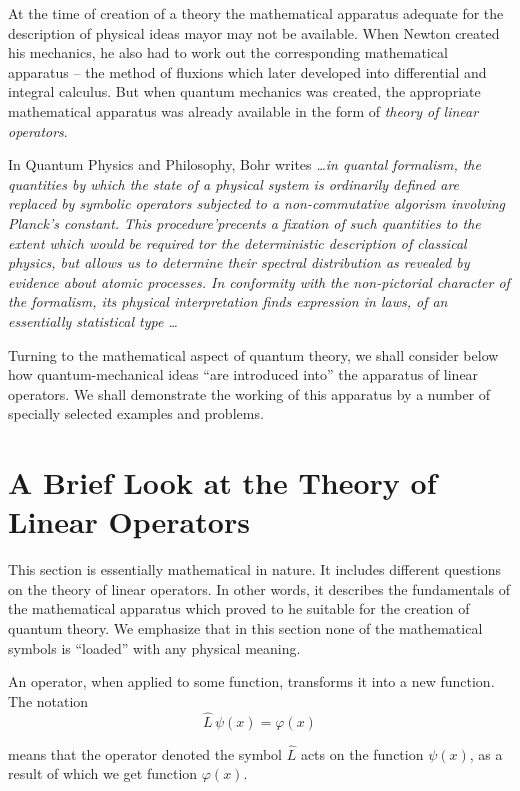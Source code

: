 \documentclass[a4paper,sfsidenotes,colorlinks=true]{tufte-book}
\numberwithin{equation}{section}
\numberwithin{figure}{section}
\begin{document}
At the time of creation of a theory the mathematical apparatus
adequate for the description of physical ideas mayor may not be
available. When Newton created his mechanics, he also had to work out
the corresponding mathematical apparatus -- the method of fluxions
which later developed into differential and integral calculus. But
when quantum mechanics was created, the appropriate mathematical
apparatus was already available in the form of \emph{theory of linear
  operators}.

In Quantum Physics and Philosophy\cite{bohr-1963}, Bohr writes \emph{
  \ldots in quantal formalism, the quantities by which the state of
  a physical system is ordinarily defined are replaced by symbolic
  operators subjected to a non-commutative algorism involving Planck's
  constant. This procedure'precents a fixation of such quantities to
  the extent which would be required tor the deterministic description
  of classical physics, but allows us to determine their spectral
  distribution as revealed by evidence about atomic processes. In
  conformity with the non-pictorial character of the formalism, its
  physical interpretation finds expression in laws, of an
  essentially statistical type \ldots}  

Turning to the mathematical aspect of quantum theory, we shall
consider below how quantum-mechanical ideas ``are introduced into'' the
apparatus of linear operators. We shall demonstrate the working of
this apparatus by a number of specially selected examples and
problems.  


\section{A Brief Look at the Theory of Linear Operators}
\label{sec-17}
This section is essentially mathematical in nature. It includes
different questions on the theory of linear operators. In other
words, it describes the fundamentals of the mathematical apparatus
which proved to he suitable for the creation of quantum theory. We
emphasize that in this section none of the mathematical symbols is
``loaded'' with any physical meaning.

An operator, when
applied to some function, transforms it into a new function. The
notation 
\begin{equation}%
\hat{L} \, \psi (x) = \varphi (x)
\label{eq-17.1} 
\end{equation}

means that the operator denoted the symbol  $\hat{L}$ acts on the function $\psi
(x)$, as a result of which we get function $\varphi (x)$. 
\end{document}
